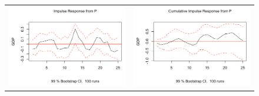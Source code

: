 \documentclass[a4paper, 12pt]{article}
\begin{document}
\begin{figure}
    \centering
    \begin{tabular}{cc}
    \includegraphics[scale = .39]{model3/P/Screen Shot 2020-11-26 at 12.59.22 AM.png} & \includegraphics[scale = .39]{model3/P/Screen Shot 2020-11-26 at 12.59.36 AM.png} \\

\end{tabular}
\end{figure}
\end{document}
